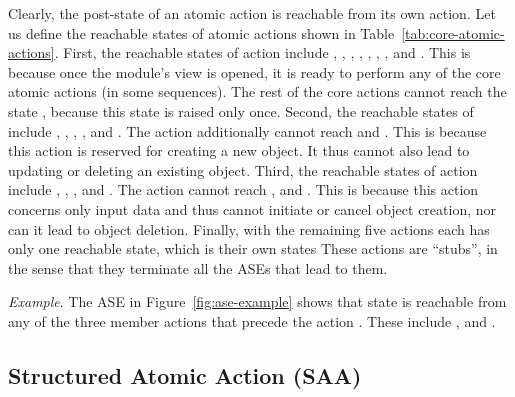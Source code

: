 Clearly, the post-state of an atomic action is reachable from its own action. Let us define the reachable states of atomic actions shown in Table~\ref{tab:core-atomic-actions}. First, the reachable states of action  include , , , , , , , and . This is because once the module's view is opened, it is ready to perform any of the core atomic actions (in some sequences). The rest of the core actions cannot reach the state , because this state is raised only once. Second, the reachable states of  include , , , , and . The action 
 additionally cannot reach  and . This is because this action is reserved for creating a new object. It thus cannot also lead to updating or deleting an existing object.
Third, the reachable states of action  include , , , and . The action  cannot reach ,  and . This is because this action concerns only input data and thus cannot initiate or cancel object creation, nor can it lead to object deletion.
%
Finally, with the remaining five actions each has only one reachable state, which is their own states These actions are ``stubs'', in the sense that they terminate all the ASEs that lead to them.

\textit{Example}. The ASE in Figure~\ref{fig:ase-example} shows that state  is reachable from any of the three member actions that precede the action . These include ,  and . 

\subsection{Structured Atomic Action (SAA)} \label{sect:arch-saa}

